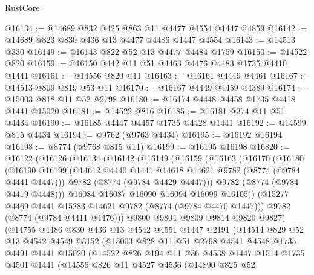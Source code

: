 \begin{lexlean}{RustCore}
\begin{coremodule}
@16134 := @14689 @832 @425 @863 @11 @4477 @4554 @1447 @4859
@16142 := @14689 @823 @830 @436 @13 @4477 @4486 @1447 @4554
@16143 := @14513 @330
@16149 := @16143 @822 @52 @13 @4477 @4484 @1759
@16150 := @14522 @820
@16159 := @16150 @442 @11 @51 @4463 @4476 @4483 @1735 @4410 @1441
@16161 := @14556 @820 @11
@16163 := @16161 @4449 @4461
@16167 := @14513 @809 @819 @53 @11
@16170 := @16167 @4449 @4459 @4389
@16174 := @15003 @818 @11 @52 @2798
@16180 := @16174 @4448 @4458 @1735 @4418 @1441 @15020
@16181 := @14522 @816
@16185 := @16181 @374 @11 @51 @4434
@16190 := @16185 @4447 @4457 @1735 @4428 @1441
@16192 := @14599 @815 @4434
@16194 := @9762 (@9763 @4434)
@16195 := @16192 @16194
@16198 := @8774 (@9768 @815 @11)
@16199 := @16195 @16198
@16820 := @16122
    (@16126
      (@16134
        (@16142
          (@16149
            (@16159
              (@16163
                (@16170
                  (@16180
                    (@16190
                      @16199
                      (@14612 @4440 @1441 @14618 @14621 @9782 (@8774 (@9784 @4441 @1447)))
                      @9782
                      (@8774 (@9784 @4429 @4447)))
                    @9782
                    (@8774 (@9784 @4419 @4448)))
                  @16084
                  @16087
                  @16090
                  @16094
                  @16099
                  @16105))
              (@15277 @4469 @1441 @15283 @14621 @9782 (@8774 (@9784 @4470 @1447)))
              @9782
              (@8774 (@9784 @4411 @4476)))
            @9800
            @9804
            @9809
            @9814
            @9820
            @9827)
          (@14755
            @4486
            @830
            @436
            @13
            @4542
            @4551
            @1447
            @2191
            (@14514
              @829
              @52
              @13
              @4542
              @4549
              @3152
              (@15003
                @828
                @11
                @51
                @2798
                @4541
                @4548
                @1735
                @4491
                @1441
                @15020
                (@14522
                  @826
                  @194
                  @11
                  @36
                  @4538
                  @1447
                  @1514
                  @1735
                  @4501
                  @1441
                  (@14556
                    @826
                    @11
                    @4527
                    @4536
                    (@14890
                      @825
                      @52

\end{coremodule}
\end{lexlean}
